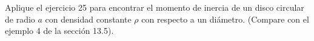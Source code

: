 \item Aplique el ejercicio 25 para encontrar el momento de inercia de un disco circular de radio $a$ con densidad constante $\rho$ con respecto a un diámetro. (Compare con el ejemplo 4 de la sección 13.5).
